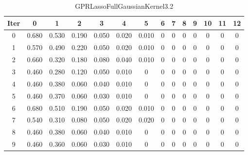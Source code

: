 \begin{table}
	\begin{center}
		\begin{tabular}{|c|c|c|c|c|c|c|c|c|c|c|c|c|c|}
			\hline
			Iter & 0 & 1 & 2 & 3 & 4 & 5 & 6 & 7 & 8 & 9 & 10 & 11 & 12 \\
			\hline
			0 & 0.680 & 0.530 & 0.190 & 0.050 & 0.020 & 0.010 & 0 & 0 & 0 & 0 & 0 & 0 & 0 \\
			\hline
			1 & 0.570 & 0.490 & 0.220 & 0.050 & 0.020 & 0.010 & 0 & 0 & 0 & 0 & 0 & 0 & 0 \\
			\hline
			2 & 0.660 & 0.320 & 0.180 & 0.080 & 0.040 & 0.010 & 0 & 0 & 0 & 0 & 0 & 0 & 0 \\
			\hline
			3 & 0.460 & 0.280 & 0.120 & 0.050 & 0.010 & 0 & 0 & 0 & 0 & 0 & 0 & 0 & 0 \\
			\hline
			4 & 0.460 & 0.380 & 0.060 & 0.040 & 0.010 & 0 & 0 & 0 & 0 & 0 & 0 & 0 & 0 \\
			\hline
			5 & 0.460 & 0.370 & 0.060 & 0.030 & 0.010 & 0 & 0 & 0 & 0 & 0 & 0 & 0 & 0 \\
			\hline
			6 & 0.680 & 0.510 & 0.190 & 0.050 & 0.020 & 0.010 & 0 & 0 & 0 & 0 & 0 & 0 & 0 \\
			\hline
			7 & 0.540 & 0.310 & 0.080 & 0.050 & 0.020 & 0.020 & 0 & 0 & 0 & 0 & 0 & 0 & 0 \\
			\hline
			8 & 0.460 & 0.380 & 0.060 & 0.040 & 0.010 & 0 & 0 & 0 & 0 & 0 & 0 & 0 & 0 \\
			\hline
			9 & 0.460 & 0.360 & 0.060 & 0.030 & 0.010 & 0 & 0 & 0 & 0 & 0 & 0 & 0 & 0 \\
			\hline
		\end{tabular}
	\end{center}
	\caption{GPRLassoFullGaussianKernel3.2}
\end{table}